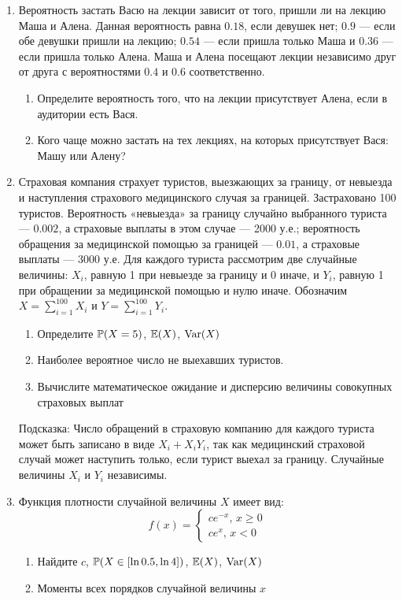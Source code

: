 \documentclass[12pt, a4paper]{article}\usepackage[]{graphicx}\usepackage[]{color}
\begin{document}
				\begin{enumerate}
					\item Вероятность застать Васю на лекции зависит от того, пришли ли на лекцию Маша и Алена. Данная вероятность равна $0.18$, если девушек нет; $0.9$ — если обе девушки пришли на лекцию; $0.54$ — если пришла только Маша и $0.36$ — если пришла только Алена. Маша и Алена посещают лекции независимо друг от друга с вероятностями $0.4$ и $0.6$ соответственно.
					\begin{enumerate}
						\item Определите вероятность того, что на лекции присутствует Алена, если в аудитории есть Вася.
						\item Кого чаще можно застать на тех лекциях, на которых присутствует Вася: Машу или Алену?
					\end{enumerate}


					\item Страховая компания страхует туристов, выезжающих за границу, от невыезда и наступления страхового медицинского случая за границей. Застраховано 100 туристов. Вероятность «невыезда» за границу случайно выбранного туриста — $0.002$, а страховые выплаты в этом случае — 2000 у.е.; вероятность обращения за медицинской помощью за границей — $0.01$, а страховые выплаты — 3000 у.е. Для каждого туриста рассмотрим две случайные величины: $X_i$, равную 1 при невыезде за границу и 0 иначе, и $Y_i$, равную 1 при обращении за медицинской помощью и нулю иначе. Обозначим $X=\sum_{i=1}^{100}X_i$ и $Y=\sum_{i=1}^{100}Y_i$.
					\begin{enumerate}
						\item Определите $\P(X=5)$, $\E(X)$, $\Var(X)$
						\item Наиболее вероятное число не выехавших туристов.
						\item Вычислите математическое ожидание и дисперсию величины совокупных страховых выплат
					\end{enumerate}
					Подсказка: Число обращений в страховую компанию для каждого туриста может быть записано в виде $X_i+X_i Y_i$, так как медицинский страховой случай может наступить только, если турист выехал за границу. Случайные величины $X_i$ и $Y_i$ независимы.

					\item Функция плотности случайной величины $X$ имеет вид:
					\begin{equation}
					f(x)=\begin{cases}
					ce^{-x}, \, x\geq 0 \\
					ce^x, \, x<0
					\end{cases}
					\end{equation}
					\begin{enumerate}
						\item Найдите $c$, $\P(X \in [\ln 0.5,\ln 4])$, $\E(X)$, $\Var(X)$
						\item Моменты всех порядков случайной величины $x$
					\end{enumerate}


\end{enumerate}
\end{document}
